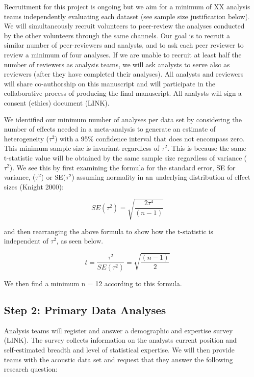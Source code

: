 \documentclass[
  english,
  man]{apa6}
\begin{document}
Recruitment for this project is ongoing but we aim for a minimum of XX analysis teams independently evaluating each dataset (see sample size justification below).
We will simultaneously recruit volunteers to peer-review the analyses conducted by the other volunteers through the same channels.
Our goal is to recruit a similar number of peer-reviewers and analysts, and to ask each peer reviewer to review a minimum of four analyses.
If we are unable to recruit at least half the number of reviewers as analysis teams, we will ask analysts to serve also as reviewers (after they have completed their analyses).
All analysts and reviewers will share co-authorship on this manuscript and will participate in the collaborative process of producing the final manuscript.
All analysts will sign a consent (ethics) document (LINK).

We identified our minimum number of analyses per data set by considering the number of effects needed in a meta-analysis to generate an estimate of heterogeneity (\(\tau^2\)) with a 95\% confidence interval that does not encompass zero.
This minimum sample size is invariant regardless of \(\tau^2\).
This is because the same t-statistic value will be obtained by the same sample size regardless of variance (\(\tau^2\)).
We see this by first examining the formula for the standard error, SE for variance, (\(\tau^2\)) or SE(\(\tau^2\)) assuming normality in an underlying distribution of effect sizes (Knight 2000):

\[SE(\tau^2) = \sqrt{\frac{2\tau^4}{(n-1)}}\]

and then rearranging the above formula to show how the t-statistic is independent of \(\tau^2\), as seen below.

\[t = \frac{\tau^2}{SE(\tau^2)} = \sqrt{\frac{(n-1)}{2}}\]

We then find a minimum n = 12 according to this formula.

\hypertarget{step-2-primary-data-analyses}{%
\subsection{Step 2: Primary Data Analyses}\label{step-2-primary-data-analyses}}

Analysis teams will register and answer a demographic and expertise survey (LINK). The survey collects information on the analysts current position and self-estimated breadth and level of statistical expertise.
We will then provide teams with the acoustic data set and request that they answer the following research question:
\end{document}
